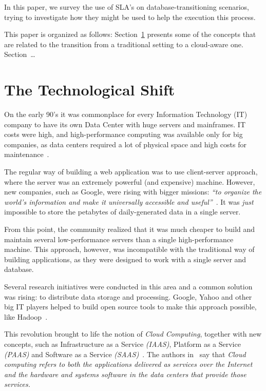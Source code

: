 \documentclass{article}
\begin{document}
In this paper, we survey the use of SLA's on database-transitioning scenarios, trying to investigate how they might be used to help the execution this process.
\bigskip

This paper is organized as follows: 
Section~\ref{sec:tts} presents some of the concepts that are related to the transition from a traditional setting to a cloud-aware one.
Section~\dots

\section{The Technological Shift}
\label{sec:tts}


On the early 90's it was commonplace for every Information Technology (IT) company to have its own Data Center with huge servers and mainframes. 
IT costs were high, and high-performance computing was available only for big companies, as data centers required a lot of physical space and high costs for maintenance~\cite{Armbrust09m.:above}.

The regular way of building a web application was to use client-server approach, where the server was an extremely powerful (and expensive) machine. 
However, new companies, such as Google, were rising with bigger missions: \textit{``to organize the world's information and make it universally accessible and useful''}~\cite{Armbrust09m.:above}. 
It was \textit{just} impossible to store the petabytes of daily-generated data in a single server. 

From this point, the community realized that it was much cheaper to build and maintain several low-performance servers than a single high-performance machine.
This approach, however, was incompatible with the traditional way of building applications, as they were designed to work with a single server and database. 

Several research initiatives were conducted in this area and a common solution was rising: to distribute data storage and processing. 
Google, Yahoo and other big IT players helped to build open source tools to make this approach possible, like Hadoop~\cite{5496972}.

This revolution brought to life the notion of \textit{Cloud Computing}, together with new concepts, such as Infrastructure as a Service \textit{(IAAS)}, Platform as a Service \textit{(PAAS)} and Software as a Service \textit{(SAAS)}~\cite{AViewOfCloudComputing}.
The authors in~\cite{AViewOfCloudComputing} say that \textit{Cloud computing refers to both the applications delivered as services over the Internet and the hardware and systems software in the data centers that provide those services.} 
\end{document}
